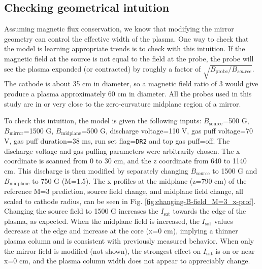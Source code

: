 
\subsection{Checking geometrical intuition}

Assuming magnetic flux conservation, we know that modifying the mirror geometry can control the effective width of the plasma. One way to check that the model is learning appropriate trends is to check with this intuition. If the magnetic field at the source is not equal to the field at the probe, the probe will see the plasma expanded (or contracted) by roughly a factor of $\sqrt{B_\text{probe}/B_{source}}$. The cathode is about 35 cm in diameter, so a magnetic field ratio of 3 would give produce a plasma approximately 60 cm in diameter. All the probes used in this study are in or very close to the zero-curvature midplane region of a mirror.

To check this intuition, the model is given the following inputs: $B_\text{source}$=500 G, $B_\text{mirror}$=1500 G, $B_\text{midplane}$=500 G, discharge voltage=110 V, gas puff voltage=70 V, gas puff duration=38 ms, run set flag=\texttt{DR2} and top gas puff=off. The discharge voltage and gas puffing parameters were arbitrarily chosen. The x coordinate is scanned from 0 to 30 cm, and the z coordinate from 640 to 1140 cm. This discharge is then modified by separately changing $B_\text{source}$ to 1500 G and $B_\text{midplane}$ to 750 G (M=1.5). %
The x profiles at the midplane (z=790 cm) of the reference M=3 prediction, source field change, and midplane field change, all scaled to cathode radius, can be seen in Fig. \ref{fig:changing-B-field_M=3_x-prof}. Changing the source field to 1500 G increases the $I_\text{sat}$ towards the edge of the plasma, as expected. When the midplane field is increased, the $I_\text{sat}$ values decrease at the edge and increase at the core (x=0 cm), implying a thinner plasma column and is consistent with previously measured behavior. When only the mirror field is modified (not shown), the strongest effect on $I_\text{sat}$ is on or near x=0 cm, and the plasma column width does not appear to appreciably change. 

